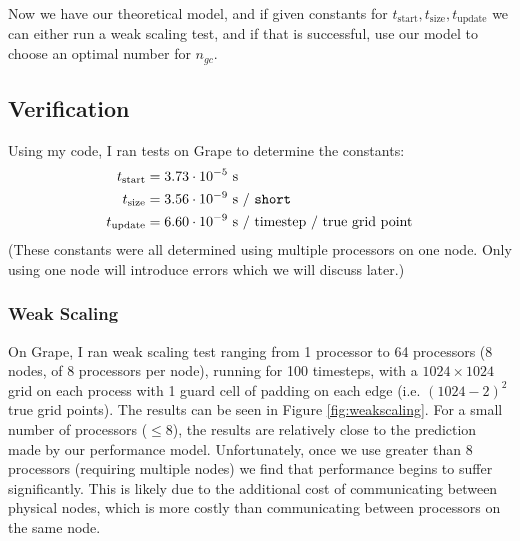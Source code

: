 \documentclass[iop, apj]{emulateapj}
\begin{document}
Now we have our theoretical model, and if given constants for $t_\mathrm{start}, t_\mathrm{size}, t_\mathrm{update}$ we can either run a weak scaling test, and if that is successful, use our model to choose an optimal number for $n_{gc}$.

\subsection{Verification}

Using my code, I ran tests on Grape to determine the constants:
\begin{align}
	t_\mathrm{start} &= 3.73 \cdot 10^{-5} \text{ s}
	\\
	t_\mathrm{size} &= 3.56 \cdot 10^{-9} \text{ s / \texttt{short}}
	\\
	t_\mathrm{update} &=6.60 \cdot 10^{-9} \text{ s / timestep / true grid point}
\end{align}
(These constants were all determined using multiple processors on one node. Only using one node will introduce errors which we will discuss later.)

\subsubsection{Weak Scaling}
On Grape, I ran weak scaling test ranging from 1 processor to 64 processors (8 nodes, of 8 processors per node), running for 100 timesteps, with a $1024 \times 1024$ grid on each process with 1 guard cell of padding on each edge (i.e. $(1024 - 2)^2$ true grid points). The results can be seen in Figure \ref{fig:weakscaling}. For a small number of processors ($\leq 8$), the results are relatively close to the prediction made by our performance model.  Unfortunately, once we use greater than 8 processors (requiring multiple nodes) we find that performance begins to suffer significantly.  This is likely due to the additional cost of communicating between physical nodes, which is more costly than communicating between processors on the same node.
\end{document}

